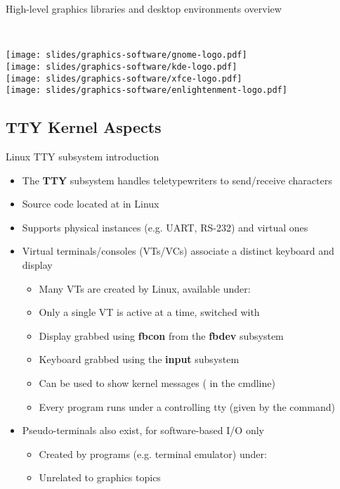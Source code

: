 \begin{frame}{High-level graphics libraries and desktop environments overview}
\begin{minipage}[b]{0.8\textwidth}
  \vfill~
  \end{minipage}
  \begin{minipage}[b]{0.09\textwidth}
  \centering
  \texttt{[image: slides/graphics-software/gnome-logo.pdf]}\\
  \vspace{1em}
  \texttt{[image: slides/graphics-software/kde-logo.pdf]}\\
  \vspace{1em}
  \texttt{[image: slides/graphics-software/xfce-logo.pdf]}\\
  \vspace{0.5em}
  \texttt{[image: slides/graphics-software/enlightenment-logo.pdf]}
  \end{minipage}
\end{frame}

\subsection{TTY Kernel Aspects}

\begin{frame}{Linux TTY subsystem introduction}
  \begin{itemize}
  \item The \textbf{TTY} subsystem handles teletypewriters to send/receive characters
  \item Source code located at  in Linux
  \item Supports physical instances (e.g. UART, RS-232) and virtual ones
  \item Virtual terminals/consoles (VTs/VCs) associate a distinct keyboard and display
    \begin{itemize}
    \item Many VTs are created by Linux, available under: 
    \item Only a single VT is active at a time, switched with 
    \item Display grabbed using \textbf{fbcon} from the \textbf{fbdev} subsystem
    \item Keyboard grabbed using the \textbf{input} subsystem
    \item Can be used to show kernel messages ( in the cmdline)
    \item Every program runs under a controlling tty (given by the  command)
    \end{itemize}
  \item Pseudo-terminals also exist, for software-based I/O only
    \begin{itemize}
    \item Created by programs (e.g. terminal emulator) under: 
    \item Unrelated to graphics topics
    \end{itemize}
  \end{itemize}
\end{frame}

